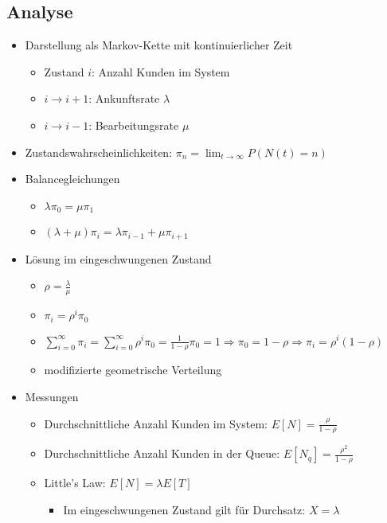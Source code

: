 \documentclass[nonacm=true, language=german]{acmart}
\begin{document}
\newpage

\subsection{Analyse}

\begin{itemize}
    \item Darstellung als Markov-Kette mit kontinuierlicher Zeit
    \begin{itemize}
        \item Zustand $i$: Anzahl Kunden im System
        \item $i \rightarrow i+1$: Ankunftsrate $\lambda$
        \item $i \rightarrow i-1$: Bearbeitungsrate $\mu$
    \end{itemize}
    \item Zustandswahrscheinlichkeiten: $ \displaystyle \pi_n = \lim_{t \to \infty} P(N(t) = n) $
    \item Balancegleichungen
    \begin{itemize}
        \item $ \lambda \pi_0 = \mu \pi_1 $
        \item $ (\lambda + \mu) \pi_i = \lambda \pi_{i-1} + \mu \pi_{i+1} $
    \end{itemize}
    \item Lösung im eingeschwungenen Zustand
    \begin{itemize}
        \item $\rho = \frac{\lambda}{\mu}$
        \item $\pi_i = \rho^i \pi_0$
        \item $ \displaystyle \sum_{i=0}^\infty \pi_i = \sum_{i=0}^\infty \rho^i \pi_0 = \frac{1}{1-\rho} \pi_0 = 1 \Rightarrow \pi_0 = 1 - \rho \Rightarrow \pi_i = \rho^i (1 - \rho) $
        \item modifizierte geometrische Verteilung
    \end{itemize}
    \item Messungen
    \begin{itemize}
        \item Durchschnittliche Anzahl Kunden im System: $ E[N] = \frac{\rho}{1-\rho} $
        \item Durchschnittliche Anzahl Kunden in der Queue: $ E[N_q] = \frac{\rho^2}{1-\rho} $
        \item Little's Law: $ E[N] = \lambda E[T] $
        \begin{itemize}
            \item Im eingeschwungenen Zustand gilt für Durchsatz: $ X = \lambda $

\end{itemize}
\end{itemize}
\end{itemize}
\end{document}
